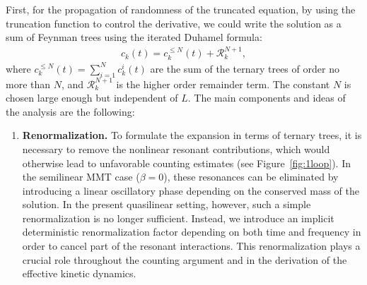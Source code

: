 \documentclass[UTF-8,reqno]{amsart}
\numberwithin{equation}{section}
\theoremstyle{definition}
\def\leq{\leqslant}
\def\leq{\leqslant}
\begin{document}
First, for the propagation of randomness of the truncated equation, by using the truncation function to control the  derivative, we could write the solution as a sum of Feynman trees using the iterated Duhamel formula:
\begin{align*} 
     c_k(t)=c^{\leq N}_k (t)+\mathcal{R}^{N+1}_k,
\end{align*}
where $  c^{\leq N}_k (t) =\sum_{i=1}^N c^{i}_k (t)$ are the sum of the ternary trees of order no more than $N$, and $\mathcal{R}^{N+1}_k$ is the higher order remainder term. The constant $N$ is chosen large enough but independent of $L$. The main components and  ideas of the  analysis are the following:
\begin{enumerate}
   \item  \textbf{Renormalization.} 
To formulate the expansion in terms of ternary trees, it is necessary to remove the nonlinear resonant contributions, which would otherwise lead to unfavorable counting estimates (see Figure~\ref{fig:1loop}). 
In the semilinear MMT case ($\beta=0$), these resonances can be eliminated by introducing a linear oscillatory phase depending on the conserved mass of the solution. 
In the present quasilinear setting, however, such a simple renormalization is no longer sufficient. 
Instead, we introduce an implicit deterministic renormalization factor depending on both time and frequency in order to cancel part of the resonant interactions. 
This renormalization plays a crucial role throughout the counting argument and in the derivation of the effective kinetic dynamics.


\end{enumerate}
\end{document}
